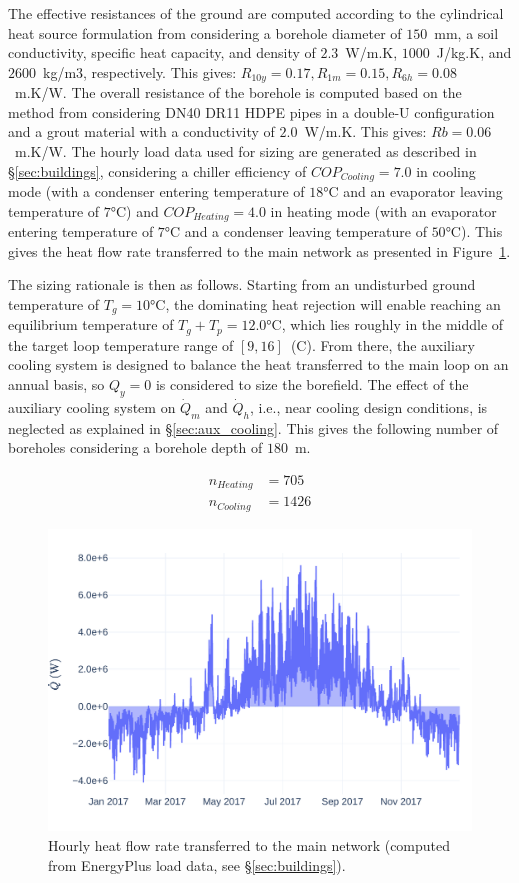 The effective resistances of the ground are computed according to the cylindrical heat source formulation from \cite{Carslaw1947} considering a borehole diameter of $150$~mm, a soil conductivity, specific heat capacity, and density of $2.3$~W/m.K, $1000$~J/kg.K, and $2600$~kg/m3, respectively.
This gives: $R_{10y} = 0.17, R_{1m} = 0.15, R_{6h} = 0.08$~m.K/W.
The overall resistance of the borehole is computed based on the method from \cite{Kavanaugh2014} considering DN40 DR11 HDPE pipes in a double-U configuration and a grout material with a conductivity of $2.0$~W/m.K. This gives: $Rb = 0.06$~m.K/W.
The hourly load data used for sizing are generated as described in §\ref{sec:buildings}, considering a chiller efficiency of $COP_{Cooling} = 7.0$ in cooling mode (with a condenser entering temperature of $18$°C and an evaporator leaving temperature of $7$°C) and $COP_{Heating} = 4.0$ in heating mode (with an evaporator entering temperature of $7$°C and a condenser leaving temperature of $50$°C). This gives the heat flow rate transferred to the main network as presented in Figure~\ref{fig:q_to_ground}.

The sizing rationale is then as follows. Starting from an undisturbed ground temperature of $T_g = 10$°C, the dominating heat rejection will enable reaching an equilibrium temperature of $T_g + T_p = 12.0$°C, which lies roughly in the middle of the target loop temperature range of $[9, 16]$~(C).
From there, the auxiliary cooling system is designed to balance the heat transferred to the main loop on an annual basis, so $Q_y = 0$ is considered to size the borefield. The effect of the auxiliary cooling system on $\dot{Q}_m$ and $\dot{Q}_h$, i.e., near cooling design conditions, is neglected as explained in §\ref{sec:aux_cooling}.
This gives the following number of boreholes considering a borehole depth of $180$~m.

\begin{align*}
n_{Heating} &= 705 \\
n_{Cooling} &= 1426
\end{align*}


\begin{figure}[!htbp]
    \centering
    \includegraphics[width=.7\linewidth]{../python_scripts/figures/QToGround.pdf}
    \caption{Hourly heat flow rate transferred to the main network (computed from EnergyPlus load data, see §\ref{sec:buildings}).}
    \label{fig:q_to_ground}
\end{figure}


